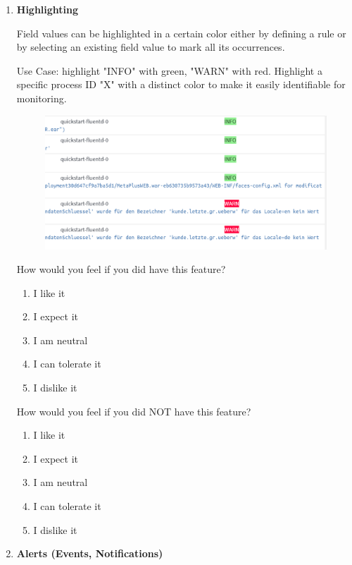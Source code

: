 \documentclass[../main.tex]{subfiles}
\begin{document}
\begin{enumerate}
    \clearpage
    \item \textbf{Highlighting}
    
    Field values can be highlighted in a certain color either by defining a rule or by selecting an existing field value to mark all its occurrences. 
    
    Use Case: highlight "INFO" with green, "WARN" with red. Highlight a specific process ID "X" with a distinct color to make it easily identifiable for monitoring.

    \begin{figure}[H]
        \centering
        \includegraphics[scale=0.55]{img/10-appendix/highlight.png}
        \label{fig:highlight}
    \end{figure}

    How would you feel if you did have this feature?
    \begin{enumerate}
        \item I like it
        \item I expect it
        \item  I am neutral
        \item I can tolerate it
        \item I dislike it
    \end{enumerate}

    How would you feel if you did NOT have this feature?
    \begin{enumerate}
        \item I like it
        \item I expect it
        \item  I am neutral
        \item I can tolerate it
        \item I dislike it
    \end{enumerate}

    \clearpage
    \item \textbf{Alerts (Events, Notifications)}
    

\end{enumerate}
\end{document}
